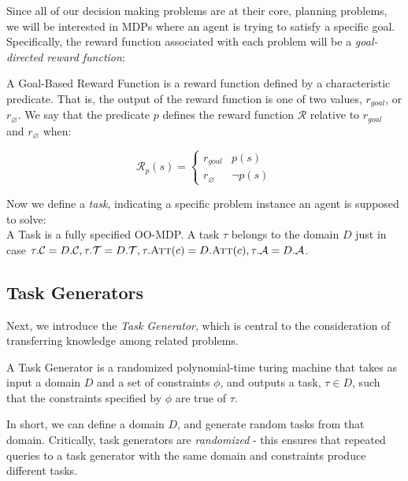 \documentclass[11pt]{article}
\begin{document}
Since all of our decision making problems are at their core, planning problems, we will be interested in MDPs where an agent is trying to satisfy a specific goal. Specifically, the reward function associated with each problem will be a {\it goal-directed reward function}: \\

{ A \textup{Goal-Based Reward Function} is a reward function defined by a characteristic predicate. That is, the output of the reward function is one of two values, $r_{goal}$, or $r_\varnothing$. We say that the predicate $p$ defines the reward function $\mathcal{R}$ relative to $r_{goal}$ and $r_\varnothing$ when:

\begin{equation}
\mathcal{R}_p(s) = \begin{cases}
r_{goal}& p(s) \\
r_\varnothing&\neg p(s)
\end{cases}
\end{equation}}

Now we define a {\it task}, indicating a specific problem instance an agent is supposed to solve: \\

{ A \textup{Task} is a fully specified OO-MDP. A task $\tau$ belongs to the domain $D$ just in case $\tau.\mathcal{C} = D.\mathcal{C}, \tau.\mathcal{T} = D.\mathcal{T}, \tau.\textsc{Att}(c) = D.\textsc{Att}(c), \tau.\mathcal{A} = D.\mathcal{A}$}.



\subsection{Task Generators}
Next, we introduce the {\it Task Generator}, which is central to the consideration of transferring knowledge among related problems.

{ A \textup{Task Generator} is a randomized polynomial-time turing machine that takes as input a domain $D$ and a set of constraints $\phi$, and outputs a task, $\tau \in D$, such that the constraints specified by $\phi$ are true of $\tau$.}

In short, we can define a domain $D$, and generate random tasks from that domain. Critically, task generators are {\it randomized} - this ensures that repeated queries to a task generator with the same domain and constraints produce different tasks.
\end{document}
